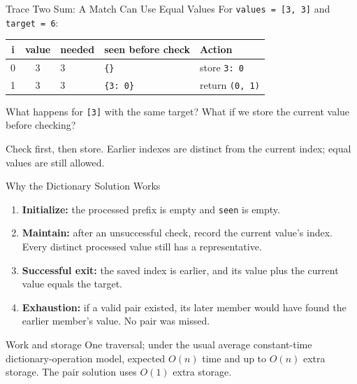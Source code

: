 \documentclass[aspectratio=169,10pt]{beamer}
\begin{document}
\begin{frame}{Trace Two Sum: A Match Can Use Equal Values}
\small
For \texttt{values = [3, 3]} and \texttt{target = 6}:
\begin{center}
\begin{tabular}{cclll}
\textbf{i} & \textbf{value} & \textbf{needed} & \textbf{seen before check} & \textbf{Action}\\\hline
0 & 3 & 3 & \texttt{\{\}} & store \texttt{3: 0}\\
1 & 3 & 3 & \texttt{\{3: 0\}} & return \texttt{(0, 1)}
\end{tabular}
\end{center}
\begin{activity}What happens for \texttt{[3]} with the same target? What if we store the current value before checking?\end{activity}
\begin{keyidea}Check first, then store. Earlier indexes are distinct from the current index; equal values are still allowed.\end{keyidea}
\end{frame}

\begin{frame}{Why the Dictionary Solution Works}
\small
\begin{enumerate}
 \item \textbf{Initialize:} the processed prefix is empty and \texttt{seen} is empty.
 \item \textbf{Maintain:} after an unsuccessful check, record the current value's index. Every distinct processed value still has a representative.
 \item \textbf{Successful exit:} the saved index is earlier, and its value plus the current value equals the target.
 \item \textbf{Exhaustion:} if a valid pair existed, its later member would have found the earlier member's value. No pair was missed.
\end{enumerate}
\begin{block}{Work and storage}
One traversal; under the usual average constant-time dictionary-operation model, expected $O(n)$ time and up to $O(n)$ extra storage. The pair solution uses $O(1)$ extra storage.
\end{block}
\end{frame}
\end{document}
